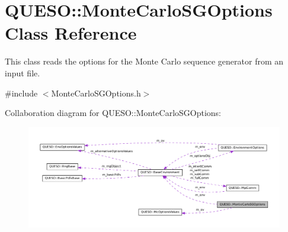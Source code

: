 \hypertarget{class_q_u_e_s_o_1_1_monte_carlo_s_g_options}{\section{Q\-U\-E\-S\-O\-:\-:Monte\-Carlo\-S\-G\-Options Class Reference}
\label{class_q_u_e_s_o_1_1_monte_carlo_s_g_options}
}


This class reads the options for the Monte Carlo sequence generator from an input file.  




{\ttfamily \#include $<$Monte\-Carlo\-S\-G\-Options.\-h$>$}



Collaboration diagram for Q\-U\-E\-S\-O\-:\-:Monte\-Carlo\-S\-G\-Options\-:
\nopagebreak
\begin{figure}[H]
\begin{center}
\leavevmode
\includegraphics[width=350pt]{class_q_u_e_s_o_1_1_monte_carlo_s_g_options__coll__graph}
\end{center}
\end{figure}
